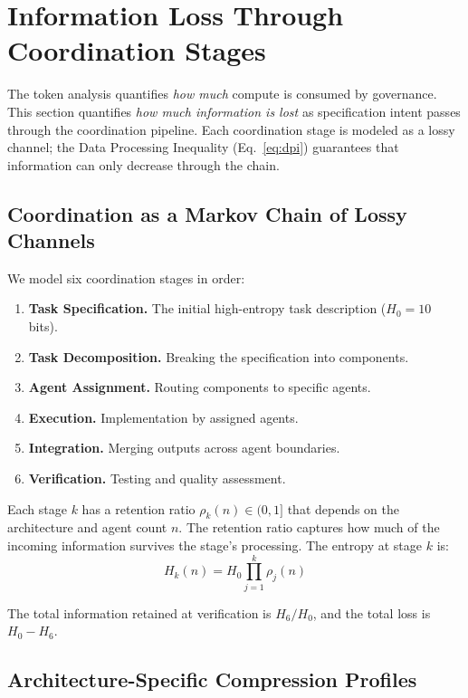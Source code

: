 \documentclass[11pt,a4paper]{article}
\begin{document}
\section{Information Loss Through Coordination Stages}
\label{sec:information-loss}

The token analysis quantifies \emph{how much} compute is consumed by governance. This section quantifies \emph{how much information is lost} as specification intent passes through the coordination pipeline. Each coordination stage is modeled as a lossy channel; the Data Processing Inequality (Eq.~\ref{eq:dpi}) guarantees that information can only decrease through the chain.

\subsection{Coordination as a Markov Chain of Lossy Channels}

We model six coordination stages in order:
\begin{enumerate}
\item \textbf{Task Specification.} The initial high-entropy task description ($H_0 = 10$ bits).
\item \textbf{Task Decomposition.} Breaking the specification into components.
\item \textbf{Agent Assignment.} Routing components to specific agents.
\item \textbf{Execution.} Implementation by assigned agents.
\item \textbf{Integration.} Merging outputs across agent boundaries.
\item \textbf{Verification.} Testing and quality assessment.
\end{enumerate}

Each stage $k$ has a retention ratio $\rho_k(n) \in (0, 1]$ that depends on the architecture and agent count $n$. The retention ratio captures how much of the incoming information survives the stage's processing. The entropy at stage $k$ is:
\begin{equation}
\label{eq:entropy-pipeline}
H_k(n) = H_0 \prod_{j=1}^{k} \rho_j(n)
\end{equation}

The total information retained at verification is $H_6 / H_0$, and the total loss is $H_0 - H_6$.

\subsection{Architecture-Specific Compression Profiles}
\end{document}
